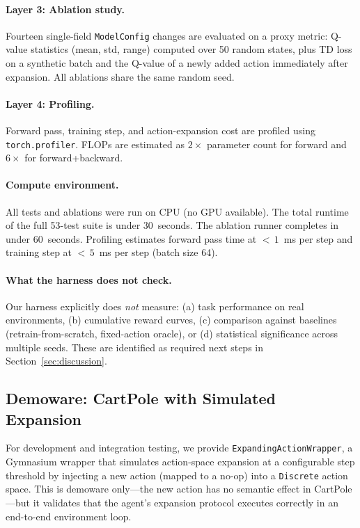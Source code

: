 \documentclass{article}
\begin{document}
\paragraph{Layer 3: Ablation study.}
Fourteen single-field \texttt{ModelConfig} changes are evaluated on a proxy
metric: Q-value statistics (mean, std, range) computed over 50 random states,
plus TD loss on a synthetic batch and the Q-value of a newly added action
immediately after expansion. All ablations share the same random seed.

\paragraph{Layer 4: Profiling.}
Forward pass, training step, and action-expansion cost are profiled using
\texttt{torch.profiler}. FLOPs are estimated as $2\times$ parameter count for
forward and $6\times$ for forward+backward.

\paragraph{Compute environment.}
All tests and ablations were run on CPU (no GPU available). The total runtime
of the full 53-test suite is under 30~seconds. The ablation runner completes
in under 60~seconds. Profiling estimates forward pass time at
${<}\,1$~ms per step and training step at ${<}\,5$~ms per step (batch size 64).

\paragraph{What the harness does not check.}
Our harness explicitly does \emph{not} measure: (a) task performance on real
environments, (b) cumulative reward curves, (c) comparison against baselines
(retrain-from-scratch, fixed-action oracle), or (d) statistical significance
across multiple seeds. These are identified as required next steps in
Section~\ref{sec:discussion}.

\subsection{Demoware: CartPole with Simulated Expansion}

For development and integration testing, we provide
\texttt{ExpandingActionWrapper}, a Gymnasium wrapper that simulates action-space
expansion at a configurable step threshold by injecting a new action (mapped to
a no-op) into a \texttt{Discrete} action space. This is demoware only---the new
action has no semantic effect in CartPole---but it validates that the agent's
expansion protocol executes correctly in an end-to-end environment loop.
\end{document}
